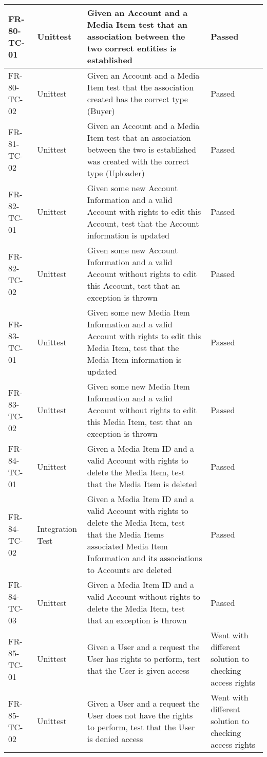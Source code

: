 \documentclass[../report.tex]{subfiles}
\begin{document}
\begin{longtable}{|L{2.1cm}|L{3cm}|C{7.5cm}|L{3cm}|}
FR-80-TC-01&Unittest&Given an Account and a Media Item test that an association between the two correct entities is established &Passed  \\ \hline
FR-80-TC-02&Unittest&Given an Account and a Media Item test that the association created has the correct type (Buyer)&Passed  \\ \hline
FR-81-TC-02&Unittest&Given an Account and a Media Item test that an association between the two is established was created with the correct type (Uploader)&Passed  \\ \hline
FR-82-TC-01&Unittest&Given some new Account Information and a valid Account with rights to edit this Account, test that the Account information is updated&Passed  \\ \hline
FR-82-TC-02&Unittest&Given some new Account Information and a valid Account without rights to edit this Account, test that an exception is thrown&Passed  \\ \hline
FR-83-TC-01&Unittest&Given some new Media Item Information and a valid Account with rights to edit this Media Item, test that the Media Item information is updated&Passed  \\ \hline
FR-83-TC-02&Unittest&Given some new Media Item Information and a valid Account without rights to edit this Media Item, test that an exception is thrown&Passed  \\ \hline
FR-84-TC-01&Unittest&Given a Media Item ID and a valid Account with rights to delete the Media Item, test that the Media Item is deleted&Passed  \\ \hline
FR-84-TC-02&Integration Test&Given a Media Item ID and a valid Account with rights to delete the Media Item, test that the Media Items associated Media Item Information and its associations to Accounts are deleted&Passed  \\ \hline
FR-84-TC-03&Unittest&Given a Media Item ID and a valid Account without rights to delete the Media Item, test that an exception is thrown&Passed  \\ \hline
FR-85-TC-01&Unittest&Given a User and a request the User has rights to perform, test that the User is given access &Went with different solution to checking access rights  \\ \hline
FR-85-TC-02&Unittest&Given a User and a request the User does not have the rights to perform, test that the User is denied access&Went with different solution to checking access rights  \\ \hline

\end{longtable}
\end{document}
